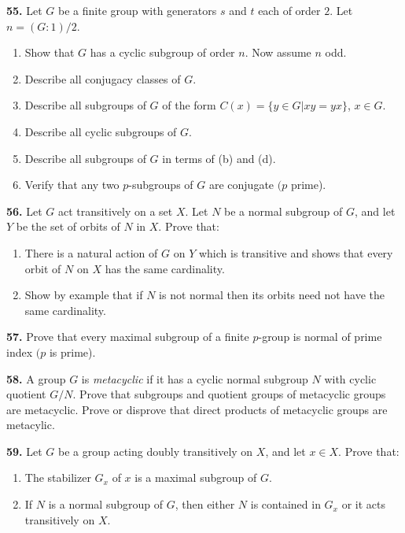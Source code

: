 \documentclass[a4paper,11pt,final]{memoir}%
\theoremstyle{nonumberplain}
\begin{document}
\medskip\noindent\textbf{55.} Let $G$ be a finite group with generators $s$
and $t$ each of order $2$. Let $n=(G:1)/2$.

\begin{enumerate}
\item Show that $G$ has a cyclic subgroup of order $n$. Now assume $n$ odd.

\item Describe all conjugacy classes of $G$.

\item Describe all subgroups of $G$ of the form $C(x)=\{y\in G|xy=yx\}$, $x\in
G$.

\item Describe all cyclic subgroups of $G$.

\item Describe all subgroups of $G$ in terms of (b) and (d).

\item Verify that any two $p$-subgroups of $G$ are conjugate $(p$ prime).
\end{enumerate}

\medskip\noindent\textbf{56.} Let $G$ act transitively on a set $X$. Let $N$
be a normal subgroup of $G$, and let $Y$ be the set of orbits of $N$ in $X$.
Prove that:

\begin{enumerate}
\item There is a natural action of $G$ on $Y$ which is transitive and shows
that every orbit of $N$ on $X$ has the same cardinality.

\item Show by example that if $N$ is not normal then its orbits need not have
the same cardinality.
\end{enumerate}

\medskip\noindent\textbf{57.} Prove that every maximal subgroup of a finite
$p$-group is normal of prime index $(p$ is prime).

\medskip\noindent\textbf{58.} A group $G$ is \textit{metacyclic\/}%
if it has a cyclic normal subgroup $N$ with cyclic quotient $G/N$. Prove that
subgroups and quotient groups of metacyclic groups are metacyclic. Prove or
disprove that direct products of metacyclic groups are metacylic.

\medskip\noindent\textbf{59.} Let $G$ be a group acting doubly transitively on
$X$, and let $x\in X$. Prove that:

\begin{enumerate}
\item The stabilizer $G_{x}$ of $x$ is a maximal subgroup of $G$.

\item If $N$ is a normal subgroup of $G$, then either $N$ is contained in
$G_{x}$ or it acts transitively on $X$.
\end{enumerate}
\end{document}
